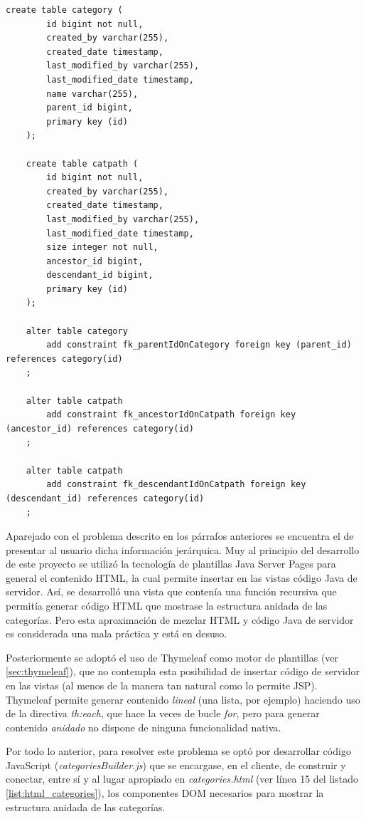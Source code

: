 \documentclass[a4paper]{article}
\begin{document}
    \begin{lstlisting}[caption=Tablas que gestionan las categorías,label=list:sql_cat]
    create table category (
    	id bigint not null, 
    	created_by varchar(255), 
    	created_date timestamp, 
    	last_modified_by varchar(255), 
    	last_modified_date timestamp, 
    	name varchar(255), 
    	parent_id bigint, 
    	primary key (id)
    );
    	
    create table catpath (
    	id bigint not null, 
    	created_by varchar(255), 
    	created_date timestamp, 
    	last_modified_by varchar(255), 
    	last_modified_date timestamp, 
    	size integer not null, 
    	ancestor_id bigint, 
    	descendant_id bigint, 
    	primary key (id)
    );
    
    alter table category 
    	add constraint fk_parentIdOnCategory foreign key (parent_id) references category(id)
    ;
    
    alter table catpath 
    	add constraint fk_ancestorIdOnCatpath foreign key (ancestor_id) references category(id)
    ;
    
    alter table catpath 
    	add constraint fk_descendantIdOnCatpath foreign key (descendant_id) references category(id)
    ;
    \end{lstlisting}
    
    Aparejado con el problema descrito en los párrafos anteriores se encuentra el de presentar al usuario dicha información jerárquica. Muy al principio del desarrollo de este proyecto se utilizó la tecnología de plantillas Java Server Pages para general el contenido HTML, la cual permite insertar en las vistas código Java de servidor. Así, se desarrolló una vista que contenía una función recursiva que permitía generar código HTML que mostrase la estructura anidada de las categorías. Pero esta aproximación de mezclar HTML y código Java de servidor es considerada una mala práctica y está en desuso.
    
    Posteriormente se adoptó el uso de Thymeleaf como motor de plantillas (ver \ref{sec:thymeleaf}), que no contempla esta posibilidad de insertar código de servidor en las vistas (al menos de la manera tan natural como lo permite JSP). Thymeleaf permite generar contenido \emph{lineal} (una lista, por ejemplo) haciendo uso de la directiva \emph{th:each}, que hace la veces de bucle \emph{for}, pero para generar contenido \emph{anidado} no dispone de ninguna funcionalidad nativa.
    
    Por todo lo anterior, para resolver este problema se optó por desarrollar código JavaScript (\emph{categoriesBuilder.js}) que se encargase, en el cliente, de construir y conectar, entre sí y al lugar apropiado en \emph{categories.html} (ver línea 15 del listado \ref{list:html_categories}), los componentes DOM necesarios para mostrar la estructura anidada de las categorías.
    \\
    
\end{document}
